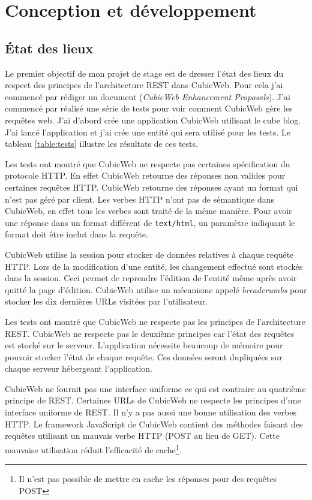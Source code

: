 \chapter{Conception et développement}
\section{État des lieux}
\label{edl}
Le premier objectif de mon projet de stage est de dresser l'état des lieux du respect des principes de l'architecture REST dans CubicWeb. Pour cela j'ai commencé par rédiger un document  (\textit{CubicWeb Enhancement Proposals}). J'ai commencé par réalisé une série de tests pour voir comment CubicWeb gère les requêtes web. J'ai d'abord crée une application CubicWeb utilisant le cube blog. J'ai lancé l'application et j'ai crée une entité qui sera utilisé pour les tests. Le tableau \ref{table:tests} illustre les résultats de ces tests. 

Les tests ont montré que CubicWeb ne respecte pas certaines spécification du protocole HTTP. En effet CubicWeb retourne des réponses non valides pour certaines requêtes HTTP. CubicWeb retourne des réponses ayant un format qui n'est pas géré par client. Les verbes HTTP n'ont pas de sémantique dans CubicWeb, en effet tous les verbes sont traité de la même manière. Pour avoir une réponse dans un format différent de \texttt{text/html}, un paramètre indiquant le format doit être inclut dans la requête. 

CubicWeb utilise la session pour stocker de données relatives à chaque requête HTTP. Lors de la modification d'une entité, les changement effectué sont stockés dans la session. Ceci permet de reprendre l'édition de l'entité même après avoir quitté la page d'édition. CubicWeb utilise un mécanisme appelé \textit{breadcrumbs} pour stocker les dix dernières URLs visitées par l'utilisateur.

Les tests ont montré que CubicWeb ne respecte pas les principes de l'architecture REST. CubicWeb ne respecte pas le deuxième principes car l'état des requêtes est stocké sur le serveur. L'application nécessite beaucoup de mémoire pour pouvoir stocker l'état de chaque requête. Ces données seront dupliquées sur chaque serveur hébergeant l'application. 

CubicWeb ne fournit pas une interface uniforme ce qui est contraire au quatrième principe de REST. Certaines URLs de CubicWeb ne respecte les principes d'une interface uniforme de REST. Il n'y a pas aussi une bonne utilisation des verbes HTTP. Le framework JavaScript de CubicWeb contient des méthodes faisant des requêtes utilisant un mauvais verbe HTTP (POST au lieu de GET). Cette mauvaise utilisation réduit l'efficacité de cache\footnote{Il n'est pas possible de mettre en cache les réponses pour des requêtes POST}.


